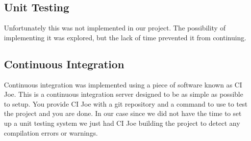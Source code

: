   \subsection{Unit Testing}

    Unfortunately this was not implemented in our project.  The possibility of
    implementing it was explored, but the lack of time prevented it from
    continuing.

  \subsection{Continuous Integration}

    Continuous integration was implemented using a piece of software known as CI
    Joe.  This is a continuous integration server designed to be as simple as
    possible to setup.  You provide CI Joe with a git repository and a command
    to use to test the project and you are done.  In our case since we did not
    have the time to set up a unit testing system we just had CI Joe building
    the project to detect any compilation errors or warnings.
